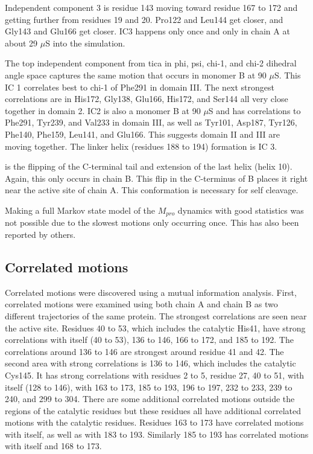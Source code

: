 \documentclass{biophys-new}
\begin{document}
Independent component 3 is residue 143 moving toward residue 167 to 172 and getting further from residues 19 and 20. Pro122 and Leu144 get closer, and Gly143 and Glu166 get closer. IC3 happens only once and only in chain A at about 29 $\mu$S into the simulation.

The top independent component from tica in phi, psi, chi-1, and chi-2 dihedral angle space captures the same motion that occurs in monomer B at 90 $\mu$S. This IC 1 correlates best to chi-1 of Phe291 in domain III. The next strongest correlations are in His172, Gly138, Glu166, His172, and Ser144 all very close together in domain 2. IC2 is also a monomer B at 90 $\mu$S and has correlations to Phe291, Tyr239, and Val233 in domain III, as well as Tyr101, Asp187, Tyr126, Phe140, Phe159, Leu141, and Glu166. This suggests domain II and III are moving together. The linker helix (residues 188 to 194) formation is IC 3. 

is the flipping of the C-terminal tail and extension of the last helix (helix 10). Again, this only occurs in chain B. This flip in the C-terminus of B places it right near the active site of chain A. This conformation is necessary for self cleavage.\cite{muramatsu2016sars, noske2020crystallographic}

Making a full Markov state model of the $M_{pro}$ dynamics with good statistics was not possible due to the slowest motions only occurring once. This has also been reported by others. \cite{carli2020candidate, cocina2020sapphire}

\subsection*{Correlated motions}

Correlated motions were discovered using a mutual information analysis. First, correlated motions were examined using both chain A and chain B as two different trajectories of the same protein. The strongest correlations are seen near the active site. Residues 40 to 53, which includes the catalytic His41, have strong correlations with itself (40 to 53), 136 to 146, 166 to 172, and 185 to 192. The correlations around 136 to 146 are strongest around residue 41 and 42. The second area with strong correlations is 136 to 146, which includes the catalytic Cys145. It has strong correlations with residues 2 to 5, residue 27, 40 to 51, with itself (128 to 146), with 163 to 173, 185 to 193, 196 to 197, 232 to 233, 239 to 240, and 299 to 304. There are some additional correlated motions outside the regions of the catalytic residues but these residues all have additional correlated motions with the catalytic residues. Residues 163 to 173 have correlated motions with itself, as well as with 183 to 193. Similarly 185 to 193 has correlated motions with itself and 168 to 173.
\end{document}
